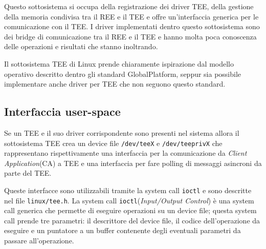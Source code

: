 \documentclass[12pt,italian]{report}
\begin{document}
Questo sottosistema si occupa della registrazione dei driver TEE, della
gestione della memoria condivisa tra il REE e il TEE e offre un'interfaccia
generica per le comunicazione con il TEE.
I driver implementati dentro questo sottosistema sono dei bridge di
comunicazione tra il REE e il TEE e hanno molta poca conoscenza delle
operazioni e risultati che stanno inoltrando.

Il sottosistema TEE di Linux prende chiaramente ispirazione dal modello
operativo descritto dentro gli standard GlobalPlatform, seppur sia possibile
implementare anche driver per TEE che non seguono questo standard.

\subsection{Interfaccia user-space}
\label{subsec:interfaccia-user-space}
Se un TEE e il suo driver corrispondente sono presenti nel sistema allora
il sottosistema TEE crea un device file \texttt{/dev/teeX} e
\texttt{/dev/teeprivX} che rappresentano rispettivamente una interfaccia
per la comunicazione da \textit{Client Application}(CA) a TEE e una
interfaccia per fare polling di messaggi asincroni da parte del TEE.

Queste interfacce sono utilizzabili tramite la system call \texttt{ioctl}
e sono descritte nel file \texttt{linux/tee.h}.
La system call \texttt{ioctl}(\textit{Input/Output Control})
è una system call generica che permette di
eseguire operazioni su un device file; questa system call
prende tre parametri:
il descrittore del device file, il codice dell'operazione da eseguire e
un puntatore a un buffer contenente degli eventuali parametri da passare
all'operazione.
\end{document}
